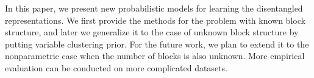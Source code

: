 In this paper, we present new probabilistic models for learning the disentangled representations. We first provide the methods for the problem with known block structure, and later we generalize it to the case of unknown block structure by putting variable clustering prior. For the future work, we plan to extend it to the nonparametric case when the number of blocks is also unknown. More empirical evaluation can be conducted on more complicated datasets.  